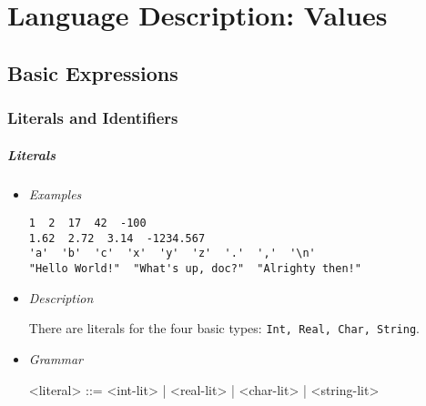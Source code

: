 \documentclass[diploma]{softlab-thesis}
\begin{document}
\newpage
\chapter{Language Description: Values}

\section{Basic Expressions}

\subsection{Literals and Identifiers}
\label{subsubsec:litsandidents}

\paragraph{Literals}
\begin{itemize}

\item \textit{Examples}
\begin{verbatim}
1  2  17  42  -100
1.62  2.72  3.14  -1234.567
'a'  'b'  'c'  'x'  'y'  'z'  '.'  ','  '\n'
"Hello World!"  "What's up, doc?"  "Alrighty then!"
\end{verbatim}

\item \textit{Description}

There are literals for the four basic types: \texttt{Int, Real, Char, String}.

\item \textit{Grammar}
\begin{grammar}
<literal> ::= <int-lit> | <real-lit> | <char-lit> | <string-lit>
\end{grammar}

\end{itemize}
\end{document}
